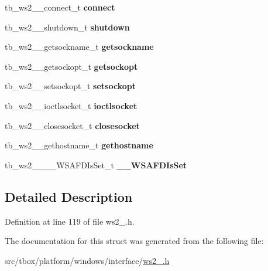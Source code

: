 \begin{DoxyCompactItemize}
\item 
\hypertarget{structtb__ws2__32__t_a8e7a25507d27dc58dae12a39cab433d4}{tb\-\_\-ws2\-\_\-\_\-connect\-\_\-t {\bfseries connect}}\label{structtb__ws2__32__t_a8e7a25507d27dc58dae12a39cab433d4}

\item 
\hypertarget{structtb__ws2__32__t_a51eba166523ad276efca9e85e9d3c2b4}{tb\-\_\-ws2\-\_\-\_\-shutdown\-\_\-t {\bfseries shutdown}}\label{structtb__ws2__32__t_a51eba166523ad276efca9e85e9d3c2b4}

\item 
\hypertarget{structtb__ws2__32__t_a52842981d854adfe4a50388b6853ad34}{tb\-\_\-ws2\-\_\-\_\-getsockname\-\_\-t {\bfseries getsockname}}\label{structtb__ws2__32__t_a52842981d854adfe4a50388b6853ad34}

\item 
\hypertarget{structtb__ws2__32__t_ac3bda7a6d204f90bc353e493a90dde52}{tb\-\_\-ws2\-\_\-\_\-getsockopt\-\_\-t {\bfseries getsockopt}}\label{structtb__ws2__32__t_ac3bda7a6d204f90bc353e493a90dde52}

\item 
\hypertarget{structtb__ws2__32__t_a6151ea15450a017526e0531e0072a233}{tb\-\_\-ws2\-\_\-\_\-setsockopt\-\_\-t {\bfseries setsockopt}}\label{structtb__ws2__32__t_a6151ea15450a017526e0531e0072a233}

\item 
\hypertarget{structtb__ws2__32__t_a78a7c968e43a692fcc2f4b657916b57c}{tb\-\_\-ws2\-\_\-\_\-ioctlsocket\-\_\-t {\bfseries ioctlsocket}}\label{structtb__ws2__32__t_a78a7c968e43a692fcc2f4b657916b57c}

\item 
\hypertarget{structtb__ws2__32__t_a00edb7b57941f08b3d72a3317b4e5017}{tb\-\_\-ws2\-\_\-\_\-closesocket\-\_\-t {\bfseries closesocket}}\label{structtb__ws2__32__t_a00edb7b57941f08b3d72a3317b4e5017}

\item 
\hypertarget{structtb__ws2__32__t_a31435316cfc8b4539dafeb1d940d47e5}{tb\-\_\-ws2\-\_\-\_\-gethostname\-\_\-t {\bfseries gethostname}}\label{structtb__ws2__32__t_a31435316cfc8b4539dafeb1d940d47e5}

\item 
\hypertarget{structtb__ws2__32__t_ac36d0fa5c7ec4acb229022dd13e36030}{tb\-\_\-ws2\-\_\-\_\-\-\_\-\-\_\-\-W\-S\-A\-F\-D\-Is\-Set\-\_\-t {\bfseries \-\_\-\-\_\-\-W\-S\-A\-F\-D\-Is\-Set}}\label{structtb__ws2__32__t_ac36d0fa5c7ec4acb229022dd13e36030}

\end{DoxyCompactItemize}


\subsection{Detailed Description}


Definition at line 119 of file ws2\-\_.\-h.



The documentation for this struct was generated from the following file\-:\begin{DoxyCompactItemize}
\item 
src/tbox/platform/windows/interface/\hyperlink{ws2__32_8h}{ws2\-\_.\-h}\end{DoxyCompactItemize}
